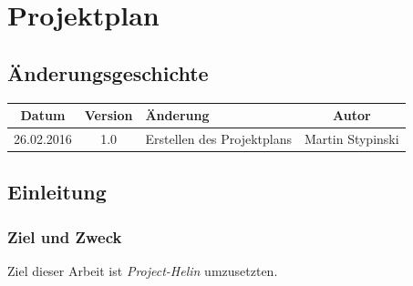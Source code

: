 

\newcommand{\greenbox}{
\begin{tikzpicture}
\draw[line width=0pt, fill=boxgreen]
(0, 0) rectangle (0.3, 0.3);
\end{tikzpicture}}

\newcommand{\orangebox}{
\begin{tikzpicture}
\draw[line width=0pt, fill=boxorange]
(0, 0) rectangle (0.3, 0.3);
\end{tikzpicture}}

\newcommand{\redbox}{
\begin{tikzpicture}
\draw[line width=0pt, fill=boxred]
(0, 0) rectangle (0.3, 0.3);
\end{tikzpicture}}


\chapter{Projektplan}
\section{Änderungsgeschichte}
\begin{tabularx}{\textwidth}{|c|c|X|c|}
  \hline
  \textbf{Datum} & \textbf{Version} & \textbf{Änderung} & \textbf{Autor} \\
  \hline \hline
  26.02.2016 & 1.0 & Erstellen des Projektplans & Martin Stypinski \\
  \hline
\end{tabularx}

\section{Einleitung}
\subsection{Ziel und Zweck}
Ziel dieser Arbeit ist \textit{Project-Helin} umzusetzten. 


